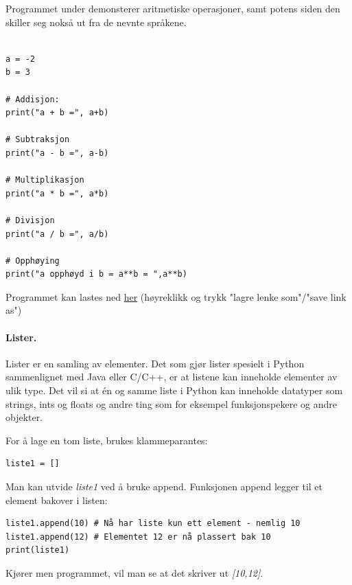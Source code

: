 \documentclass[%
oneside,                 %
final,                   %
10pt]{article}
\begin{document}
Programmet under demonsterer aritmetiske operasjoner, samt potens siden den skiller seg nokså ut fra de nevnte språkene.

\begin{verbatim}

a = -2
b = 3

# Addisjon:
print("a + b =", a+b)

# Subtraksjon
print("a - b =", a-b)

# Multiplikasjon
print("a * b =", a*b)

# Divisjon
print("a / b =", a/b)

# Opphøying
print("a opphøyd i b = a**b = ",a**b)
\end{verbatim}
Programmet kan lastes ned \href{{https://github.com/krisbhei/INF2310/raw/master/Programmering/Python/aritmetikk.py}}{her} (høyreklikk og trykk "lagre lenke som"/"save link as")

\paragraph{Lister.}
Lister er en samling av elementer. Det som gjør lister spesielt i Python sammenlignet med Java eller C/C++, er at listene kan inneholde elementer av ulik type.
Det vil si at én og samme liste i Python kan inneholde datatyper som strings, ints og floats og andre ting som for eksempel funksjonspekere og andre objekter.

For å lage en tom liste, brukes klammeparantes:
\begin{verbatim}
liste1 = []
\end{verbatim}

Man kan utvide \emph{liste1} ved å bruke append. Funksjonen append legger til et element bakover i listen:
\begin{verbatim}
liste1.append(10) # Nå har liste kun ett element - nemlig 10
liste1.append(12) # Elementet 12 er nå plassert bak 10
print(liste1)
\end{verbatim}
Kjører men programmet, vil man se at det skriver ut \emph{[10,12]}.



\vspace{3mm}
\end{document}
